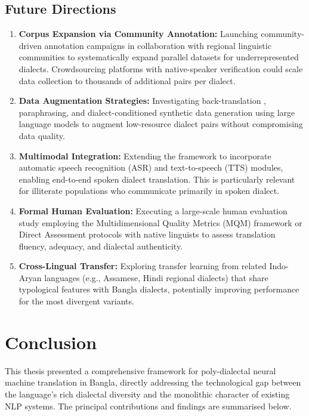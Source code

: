 \documentclass[12pt,a4paper]{article}
\begin{document}
\subsection{Future Directions}
\begin{enumerate}[leftmargin=*]
    \item \textbf{Corpus Expansion via Community Annotation:} Launching community-driven annotation campaigns in collaboration with regional linguistic communities to systematically expand parallel datasets for underrepresented dialects. Crowdsourcing platforms with native-speaker verification could scale data collection to thousands of additional pairs per dialect.
    \item \textbf{Data Augmentation Strategies:} Investigating back-translation \cite{sennrich-etal-2016-improving}, paraphrasing, and dialect-conditioned synthetic data generation using large language models \cite{brown2020language, touvron2023llama} to augment low-resource dialect pairs without compromising data quality.
    \item \textbf{Multimodal Integration:} Extending the framework to incorporate automatic speech recognition (ASR) \cite{radford2023robust} and text-to-speech (TTS) modules, enabling end-to-end spoken dialect translation. This is particularly relevant for illiterate populations who communicate primarily in spoken dialect.
    \item \textbf{Formal Human Evaluation:} Executing a large-scale human evaluation study employing the Multidimensional Quality Metrics (MQM) framework \cite{burchardt-2013-multidimensional} or Direct Assessment protocols \cite{graham2017machine} with native linguists to assess translation fluency, adequacy, and dialectal authenticity.
    \item \textbf{Cross-Lingual Transfer:} Exploring transfer learning from related Indo-Aryan languages (e.g., Assamese, Hindi regional dialects) that share typological features with Bangla dialects, potentially improving performance for the most divergent variants.
\end{enumerate}

\newpage

\section{Conclusion}

This thesis presented a comprehensive framework for poly-dialectal neural machine translation in Bangla, directly addressing the technological gap between the language's rich dialectal diversity and the monolithic character of existing NLP systems. The principal contributions and findings are summarised below.
\end{document}
